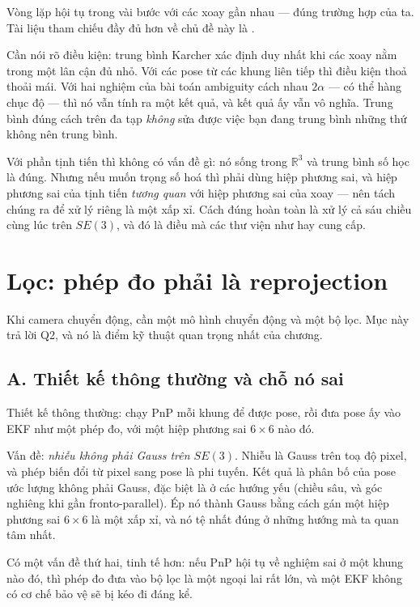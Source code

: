 \documentclass[../../marker.tex]{subfiles}
\begin{document}
Vòng lặp hội tụ trong vài bước với các xoay gần nhau --- đúng trường hợp của ta. Tài liệu tham chiếu đầy đủ hơn về chủ đề này là \cite{hartley2013rotation}.

Cần nói rõ điều kiện: trung bình Karcher xác định duy nhất khi các xoay nằm trong một lân cận đủ nhỏ. Với các pose từ các khung liên tiếp thì điều kiện thoả thoải mái. Với hai nghiệm của bài toán ambiguity cách nhau \(2\alpha\) --- có thể hàng chục độ --- thì nó vẫn tính ra một kết quả, và kết quả ấy vẫn vô nghĩa. Trung bình đúng cách trên đa tạp \emph{không} sửa được việc bạn đang trung bình những thứ không nên trung bình.

Với phần tịnh tiến thì không có vấn đề gì: nó sống trong \(\mathbb{R}^3\) và trung bình số học là đúng. Nhưng nếu muốn trọng số hoá thì phải dùng hiệp phương sai, và hiệp phương sai của tịnh tiến \emph{tương quan} với hiệp phương sai của xoay --- nên tách chúng ra để xử lý riêng là một xấp xỉ. Cách đúng hoàn toàn là xử lý cả sáu chiều cùng lúc trên \(SE(3)\), và đó là điều mà các thư viện như  hay  cung cấp.

\section{Lọc: phép đo phải là reprojection}

Khi camera chuyển động, cần một mô hình chuyển động và một bộ lọc. Mục này trả lời Q2, và nó là điểm kỹ thuật quan trọng nhất của chương.

\subsection{A. Thiết kế thông thường và chỗ nó sai}

Thiết kế thông thường: chạy PnP mỗi khung để được pose, rồi đưa pose ấy vào EKF như một phép đo, với một hiệp phương sai \(6\times6\) nào đó.

Vấn đề: \emph{nhiễu không phải Gauss trên \(SE(3)\)}. Nhiễu là Gauss trên toạ độ pixel, và phép biến đổi từ pixel sang pose là phi tuyến. Kết quả là phân bố của pose ước lượng không phải Gauss, đặc biệt là ở các hướng yếu (chiều sâu, và góc nghiêng khi gần fronto-parallel). Ép nó thành Gauss bằng cách gán một hiệp phương sai \(6\times6\) là một xấp xỉ, và nó tệ nhất đúng ở những hướng mà ta quan tâm nhất.

Có một vấn đề thứ hai, tinh tế hơn: nếu PnP hội tụ về nghiệm sai ở một khung nào đó, thì phép đo đưa vào bộ lọc là một ngoại lai rất lớn, và một EKF không có cơ chế bảo vệ sẽ bị kéo đi đáng kể.
\end{document}

